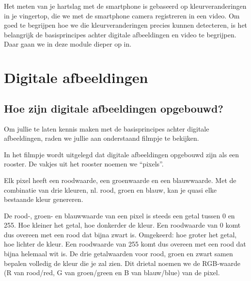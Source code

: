 \label{sec:digafbvid}

\begin{samenvatting}
Het meten van je hartslag met de smartphone is gebaseerd op kleurveranderingen in je vingertop, die we met de smartphone camera registreren in een video. Om goed te begrijpen hoe we die kleurveranderingen precies kunnen detecteren, is het belangrijk de basisprincipes achter digitale afbeeldingen en video te begrijpen. Daar gaan we in deze module dieper op in.
\end{samenvatting}
%

\section{Digitale afbeeldingen}
\label{sec:Mod3_Sec1}
%

\subsection{Hoe zijn digitale afbeeldingen opgebouwd?}

Om jullie te laten kennis maken met de basisprincipes achter digitale afbeeldingen, raden we jullie aan onderstaand filmpje te bekijken.


In het filmpje wordt uitgelegd dat digitale afbeeldingen opgebouwd zijn als een rooster. De vakjes uit het rooster noemen we \textquotedblleft pixels\textquotedblright. 

Elk pixel heeft een roodwaarde, een groenwaarde en een blauwwaarde. Met de combinatie van drie kleuren, nl. rood, groen en blauw, kan je quasi elke bestaande kleur genereren. 

De rood-, groen- en blauwwaarde van een pixel is steeds een getal tussen 0 en 255. Hoe kleiner het getal, hoe donkerder de kleur. Een roodwaarde van 0 komt dus overeen met een rood dat bijna zwart is. Omgekeerd: hoe groter het getal, hoe lichter de kleur. Een roodwaarde van 255 komt dus overeen met een rood dat bijna helemaal wit is. De drie getalwaarden voor rood, groen en zwart samen bepalen volledig de kleur die je zal zien. Dit drietal noemen we de RGB-waarde (R van rood/red, G van groen/green en B van blauw/blue) van de pixel.

